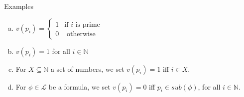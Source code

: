 \documentclass[../slides.tex]{subfiles}
\begin{document}
\begin{frame}{Examples}
{\begin{enumerate}[(a)]
			\item $v(p_i)=\begin{cases} 1 & \text{if }i\text{ is prime}\\0 & \text{ otherwise}\end{cases}$
			
			\item $v(p_i)=1$ for all $i\in \mathbb{N}$
			
			\item For $X\subseteq \mathbb{N}$ a set of numbers, we set $v(p_i)=1$ iff $i\in X$.
			
			\item For $\phi\in\mathcal{L}$ be a formula, we set $v(p_i)=0$ iff $p_i\in sub(\phi)$, for all $i\in\mathbb{N}$.
			
			 	
		\end{enumerate}}

\end{frame}
\end{document}
